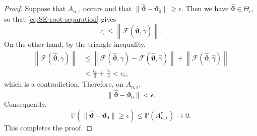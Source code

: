 \documentclass[12pt,reqno]{amsart}
\newcommand{\pr}{\mathbb{P}}
\renewcommand{\hat}{\widehat}
\begin{document}
{\begin{proof}
Suppose that $A_{n,\epsilon}$ occurs and that $\|\hat{\bm\vartheta}-\bm\vartheta_0\|
\ge\epsilon.$
Then we have
$\hat{\bm\vartheta}\in\Theta_\epsilon$, so that
\eqref{eq:SE-root-separation} gives
\[
c_\epsilon
\le
\left\|
\mathcal F(\hat{\bm\vartheta},\gamma)
\right\|.
\]
On the other hand, by the triangle inequality,
\begin{align*}
\left\|
\mathcal F(\hat{\bm\vartheta},\gamma)
\right\|
&\le
\left\|
\mathcal F(\hat{\bm\vartheta},\gamma)
-
\mathcal F(\hat{\bm\vartheta},\hat\gamma)
\right\|
+
\left\|
\mathcal F(\hat{\bm\vartheta},\hat\gamma)
\right\|\\
&<
\frac{c_\epsilon}{3}
+
\frac{c_\epsilon}{3}
<
c_\epsilon,
\end{align*}
which is a contradiction. Therefore, on $A_{n,\epsilon}$,
\[
\|\hat{\bm\vartheta}-\bm\vartheta_0\|<\epsilon.
\]
Consequently,
\[
\pr\left(
\|\hat{\bm\vartheta}-\bm\vartheta_0\|
\ge\epsilon
\right)
\le
\pr(A_{n,\epsilon}^c)
\rightarrow0.
\]
This completes the proof.
\end{proof}
}
\end{document}

